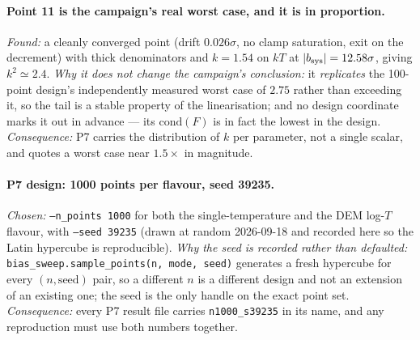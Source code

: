 \documentclass[11pt]{article}
\begin{document}
\paragraph{Point 11 is the campaign's real worst case, and it is in
proportion.} \emph{Found:} a cleanly converged point (drift $0.026\sigma$, no
clamp saturation, exit on the decrement) with thick denominators and
$k=1.54$ on $kT$ at $|b_{\rm sys}|=12.58\sigma$, giving $k^2\simeq2.4$.
\emph{Why it does not change the campaign's conclusion:} it \emph{replicates}
the 100-point design's independently measured worst case of $2.75$ rather than
exceeding it, so the tail is a stable property of the linearisation; and no
design coordinate marks it out in advance --- its $\mathrm{cond}(F)$ is in fact
the lowest in the design. \emph{Consequence:} P7 carries the distribution of
$k$ per parameter, not a single scalar, and quotes a worst case near
$1.5\times$ in magnitude.


\paragraph{P7 design: 1000 points per flavour, seed 39235.} \emph{Chosen:}
\texttt{--n\_points 1000} for both the single-temperature and the DEM log-$T$
flavour, with \texttt{--seed 39235} (drawn at random 2026-09-18 and recorded
here so the Latin hypercube is reproducible). \emph{Why the seed is recorded
rather than defaulted:} \texttt{bias\_sweep.sample\_points(n, mode, seed)}
generates a fresh hypercube for every $(n,\text{seed})$ pair, so a different
$n$ is a different design and not an extension of an existing one; the seed is
the only handle on the exact point set. \emph{Consequence:} every P7 result
file carries \texttt{n1000\_s39235} in its name, and any reproduction must use
both numbers together.
\end{document}
